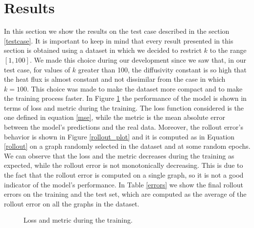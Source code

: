 \documentclass[11pt,a4paper]{article}
\begin{document}
\section{Results}
\label{results}
In this section we show the results on the test case described in the section \ref{testcase}. It is important to keep in mind that every result presented in this section is obtained using a dataset in which we decided to restrict \(k\) to the range \([1,100]\). We made this choice during our development since we saw that, in our test case, for values of \(k\) greater than 100, the diffusivity constant is so high that the heat flux is almost constant and not dissimilar from the case in which \(k=100\). This choice was made to make the dataset more compact and to make the training process faster.
In Figure \ref{loss} the performance of the model is shown in terms of loss and metric during the training. 
The loss function considered is the one defined in equation \eqref{mse}, while the metric is the mean absolute error between the model's predictions and the real data. 
Moreover, the rollout error's behavior is shown in Figure \ref{rollout_plot} and it is computed as in Equation \eqref{rollout} on a graph randomly selected in the dataset and at some random epochs. We can observe that the loss and the metric decreases during the training as expected, while the rollout error is not monotonically decreasing. This is due to the fact that the rollout error is computed on a single graph, so it is not a good indicator of the model's performance.
In Table \ref{errors} we show the final rollout errors on the training and the test set, which are computed as the average of the rollout error on all the graphs in the dataset.

\begin{figure}[H]
    \centering
    \caption{Loss and metric during the training.}
    \label{loss}
\end{figure}
\end{document}

